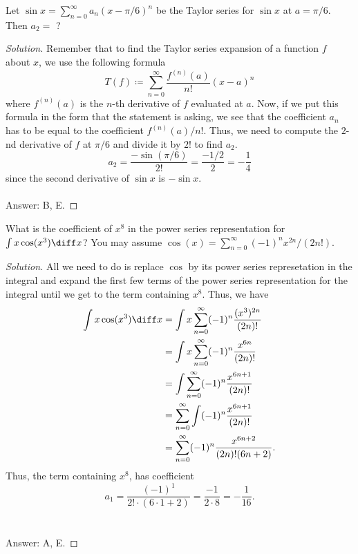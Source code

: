 \begin{problem}
Let $\sin x=\sum_{n=0}^\infty a_n\left(x-\pi/6\right)^n$ be the Taylor
series for $\sin x$ at $a=\pi/6$. Then $a_2=$ ?
\end{problem}
\begin{proof}[Solution]
Remember that to find the Taylor series expansion of a function $f$ about
$x$, we use the following formula
\[
T(f)\coloneqq\sum_{n=0}^\infty\frac{f^{(n)}(a)}{n!}(x-a)^n
\]
where $f^{(n)}(a)$ is the $n$-th derivative of $f$ evaluated at $a$. Now,
if we put this formula in the form that the statement is asking, we see
that the coefficient $a_n$ has to be equal to the coefficient
$f^{(n)}(a)/n!$. Thus, we need to compute the $2$-nd derivative of $f$ at
$\pi/6$ and divide it by $2!$ to find $a_2$.
\[
a_2=\frac{-\sin(\pi/6)}{2!}=\frac{-1/2}{2}=-\frac{1}{4}
\]
since the second derivative of $\sin x$ is $-\sin x$.
\\\\
Answer: {\color{Green}B}, {\color{Red}E}.
\end{proof}

\begin{problem}
What is the coefficient of  $x^8$ in the power series representation for
$\int x\cos(x^3)\diff x$? You may assume $\cos(x)=\sum_{n=0}^\infty(-1)^n
x^{2n}/(2n!)$.
\end{problem}
\begin{proof}[Solution]
All we need to do is replace $\cos$ by its power series represetation in
the integral and expand the first few terms of the power series
representation for the integral until we get to the term containing
$x^8$. Thus, we have
\begin{align*}
\int x\cos(x^3)\diff x
&=\int x\sum_{n=0}^\infty(-1)^n\frac{(x^3)^{2n}}{(2n)!}\\
&=\int x\sum_{n=0}^\infty(-1)^n\frac{x^{6n}}{(2n)!}\\
&=\int\sum_{n=0}^\infty(-1)^n\frac{x^{6n+1}}{(2n)!}\\
&=\sum_{n=0}^\infty\int(-1)^n\frac{x^{6n+1}}{(2n)!}\\
&=\sum_{n=0}^\infty(-1)^n\frac{x^{6n+2}}{(2n)!(6n+2)}.
\end{align*}
Thus, the term containing $x^8$, has coefficient
\[
a_1=\frac{(-1)^1}{2!\cdot(6\cdot 1+2)}=\frac{-1}{2\cdot 8}=-\frac{1}{16}.
\]
\\\\
Answer: {\color{Green}A}, {\color{Red}E}.
\end{proof}

